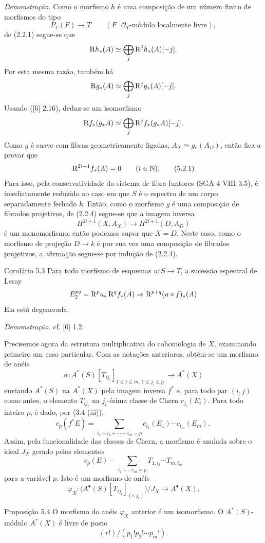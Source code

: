 \emph{Demonstração.} Como o morfismo $h$ é uma composição de um número finito de morfismos do tipo
\[
P_T(F)\to T\qquad (F\text{ }\mathcal O_T\text{-módulo localmente livre}),
\tag{Q}
\]
de (2.2.1) segue-se que
\[
\mathrm{R} h_*(A)\simeq\bigoplus_j \mathrm{R}^jh_*(A)[-j].
\]
Por esta mesma razão, também há
\[
\mathrm{R} g_*(A)\simeq\bigoplus_j \mathrm{R}^jg_*(A)[-j].
\]
Usando ([6] 2.16), deduz-se um isomorfismo
\[
\mathrm{R} f_*(g_*A)\simeq\bigoplus_j \mathrm{R}^j f_*(g_*A)[-j].
\]
Como $g$ é suave com fibras geometricamente ligadas, $A_X\simeq g_*(A_D)$, então fica a provar que
\[
\mathrm{R}^{2i+1}f_*(A)=0\qquad (i\in\mathbb N).
\tag{5.2.1}
\]
Para isso, pela conservatividade do sistema de fibra funtores (SGA 4 VIII 3.5), é imediatamente reduzido ao caso em que $S$ é o espectro de um corpo separadamente fechado $k$. Então, como o morfismo $g$ é uma composição de fibrados projetivos, de (2.2.4) segue-se que a imagem inversa
\[
H^{2i+1}(X,A_X)\to H^{2i+1}(D,A_D)
\]
é um monomorfismo, então podemos supor que $X=D$. Neste caso, como o morfismo de projeção $D\to k$ é por sua vez uma composição de fibrados projetivos, a afirmação segue-se por indução de (2.2.4).

\begin{statement}{Corolário 5.3}
Para todo morfismo de esquemas $u:S\to T$, a sucessão espectral de Leray
\[
E_2^{pq}=\mathrm{R}^p u_*\,\mathrm{R}^q f_*(A)\Rightarrow \mathrm{R}^{p+q}(u\circ f)_*(A)
\]
Ela está degenerada.
\end{statement}

\emph{Demonstração.} cf. [6] 1.2.

Precisemos agora da estrutura multiplicativa do cohomologia de $X$, examinando primeiro um caso particular. Com as notações anteriores, obtém-se um morfismo de anéis
\[
\alpha:A^*(S)[T_{ij_i}]_{1\le i\le m,\,1\le j_i\le p_i}\to A^*(X)
\]
enviando $A^*(S)$ na $A^*(X)$ pela imagem inversa $f^*$ e, para todo par $(i,j)$ como antes, o elemento $T_{ij_i}$ na $j_i$-ésima classe de Chern $c_{j_i}(E_i)$. Para todo inteiro $p$, é dado, por (3.4 (iii)),
\[
c_p(f^*E)=\sum_{i_1+i_2+\cdots+i_m=p}c_{i_1}(E_1)\cdots c_{i_m}(E_m),
\]
Assim, pela funcionalidade das classes de Chern, a morfismo é anulada sobre o ideal $J_X$ gerado pelos elementos
\[
c_p(E)-\sum_{i_1+\cdots i_m=p}T_{1,i_1}\cdots T_{m,i_m}
\]
para a variável $p$. Isto é um morfismo de anéis
\[
\varphi_X:\bigl(A^{\bullet}(S)[T_{ij_i}]_{(i,j_i)}\bigr)/J_X\to A^{\bullet}(X).
\]

\begin{statement}{Proposição 5.4}
O morfismo do anéis $\varphi_X$ anterior é um isomorfismo. O $A^*(S)$-módulo $A^*(X)$ é livre de posto
\[
(r!)/(p_1!p_2!\cdots p_m!).
\]
\end{statement}
